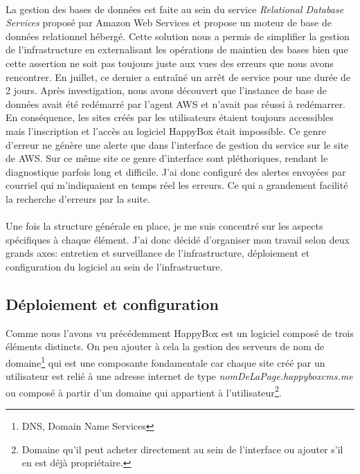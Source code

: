 \documentclass[11pt, a4paper ]{article}
\begin{document}
\begin{spacing}{1.5}
\paragraph{}
La gestion des bases de données est faite au sein du service \emph{Relational Database Services} proposé par Amazon Web Services et propose un moteur de base de données relationnel hébergé. Cette solution nous a permis de simplifier la gestion de l’infrastructure en externalisant les opérations de maintien des bases bien que cette assertion ne soit pas toujours juste aux vues des erreurs que nous avons rencontrer. En juillet, ce dernier a entraîné un arrêt de service pour une durée de 2 jours. Après investigation, nous avons découvert que l'instance de base de données avait été redémarré par l'agent AWS et n'avait pas réussi à redémarrer. En conséquence, les sites créés par les utilisateurs étaient toujours accessibles mais l'inscription et l'accès au logiciel HappyBox était impossible.
Ce genre d'erreur ne génère une alerte que dans l'interface de gestion du service sur le site de AWS. Sur ce même site ce genre d'interface sont pléthoriques, rendant le diagnostique parfois long et difficile. J'ai donc configuré des alertes envoyées par courriel qui m'indiquaient en temps réel les erreurs. Ce qui a grandement facilité la recherche d'erreurs par la suite.
\paragraph{}
Une fois la structure générale en place, je me suis concentré sur les aspects spécifiques à chaque élément.
J'ai donc décidé d'organiser mon travail selon deux grands axes: entretien et surveillance de l’infrastructure, déploiement et configuration du logiciel au sein de l'infrastructure.

\subsection{Déploiement et configuration}

Comme nous l'avons vu précédemment HappyBox est un logiciel composé de trois éléments distincts. On peu ajouter à cela la gestion des serveurs de nom de domaine\footnote{DNS, Domain Name Services} qui est une composante fondamentale car chaque site créé par un utilisateur est relié à une adresse internet de type \emph{nomDeLaPage.happyboxcms.me} ou composé à partir d'un domaine qui appartient à l'utilisateur\footnote{Domaine qu'il peut acheter directement au sein de l'interface ou ajouter s'il en est déjà propriétaire.}.

\end{spacing}
\end{document}

